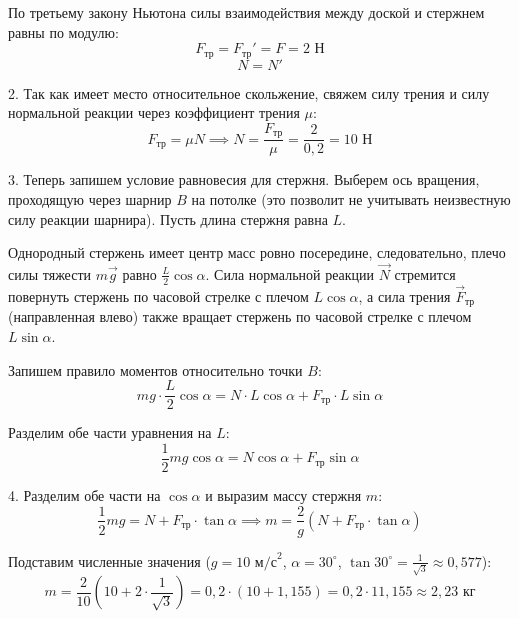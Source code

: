 \begin{taskadvanced}
\begin{solutionbox}
По третьему закону Ньютона силы взаимодействия между доской и стержнем равны по модулю:
$$F_{\text{тр}} = F_{\text{тр}}' = F = 2\text{ Н}$$
$$N = N'$$

2. Так как имеет место относительное скольжение, свяжем силу трения и силу нормальной реакции через коэффициент трения $\mu$:
$$F_{\text{тр}} = \mu N \implies N = \frac{F_{\text{тр}}}{\mu} = \frac{2}{0{,}2} = 10\text{ Н}$$

3. Теперь запишем условие равновесия для стержня. Выберем ось вращения, проходящую через шарнир $B$ на потолке (это позволит не учитывать неизвестную силу реакции шарнира). Пусть длина стержня равна $L$. 

Однородный стержень имеет центр масс ровно посередине, следовательно, плечо силы тяжести $m\vec{g}$ равно $\frac{L}{2}\cos\alpha$. Сила нормальной реакции $\vec{N}$ стремится повернуть стержень по часовой стрелке с плечом $L\cos\alpha$, а сила трения $\vec{F}_{\text{тр}}$ (направленная влево) также вращает стержень по часовой стрелке с плечом $L\sin\alpha$.

Запишем правило моментов относительно точки $B$:
$$mg \cdot \frac{L}{2}\cos\alpha = N \cdot L\cos\alpha + F_{\text{тр}} \cdot L\sin\alpha$$

Разделим обе части уравнения на $L$:
$$\frac{1}{2}mg\cos\alpha = N\cos\alpha + F_{\text{тр}}\sin\alpha$$

4. Разделим обе части на $\cos\alpha$ и выразим массу стержня $m$:
$$\frac{1}{2}mg = N + F_{\text{тр}}\cdot\tan\alpha \implies m = \frac{2}{g}\left(N + F_{\text{тр}}\cdot\tan\alpha\right)$$

Подставим численные значения ($g = 10\text{ м/с}^2$, $\alpha = 30^\circ$, $\tan 30^\circ = \frac{1}{\sqrt{3}} \approx 0{,}577$):
$$m = \frac{2}{10}\left(10 + 2 \cdot \frac{1}{\sqrt{3}}\right) = 0{,}2 \cdot \left(10 + 1{,}155\right) = 0{,}2 \cdot 11{,}155 \approx 2{,}23\text{ кг}$$
\end{solutionbox}

\end{taskadvanced}

